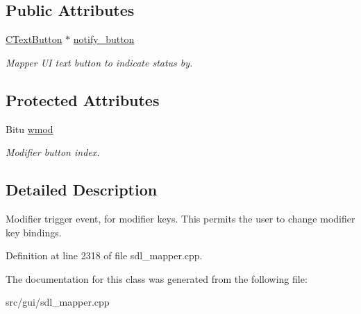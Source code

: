 \subsection*{Public Attributes}
\begin{DoxyCompactItemize}
\item 
\hypertarget{classCModEvent_aa5dc746da9ec638e1959bfd1dddafc75}{\hyperlink{classCTextButton}{C\-Text\-Button} $\ast$ \hyperlink{classCModEvent_aa5dc746da9ec638e1959bfd1dddafc75}{notify\-\_\-button}}\label{classCModEvent_aa5dc746da9ec638e1959bfd1dddafc75}

\begin{DoxyCompactList}\small\item\em Mapper U\-I text button to indicate status by. \end{DoxyCompactList}\end{DoxyCompactItemize}
\subsection*{Protected Attributes}
\begin{DoxyCompactItemize}
\item 
\hypertarget{classCModEvent_a54a25228b8da694c33c44e4b161defd9}{Bitu \hyperlink{classCModEvent_a54a25228b8da694c33c44e4b161defd9}{wmod}}\label{classCModEvent_a54a25228b8da694c33c44e4b161defd9}

\begin{DoxyCompactList}\small\item\em Modifier button index. \end{DoxyCompactList}\end{DoxyCompactItemize}


\subsection{Detailed Description}
Modifier trigger event, for modifier keys. This permits the user to change modifier key bindings. 

Definition at line 2318 of file sdl\-\_\-mapper.\-cpp.



The documentation for this class was generated from the following file\-:\begin{DoxyCompactItemize}
\item 
src/gui/sdl\-\_\-mapper.\-cpp\end{DoxyCompactItemize}
